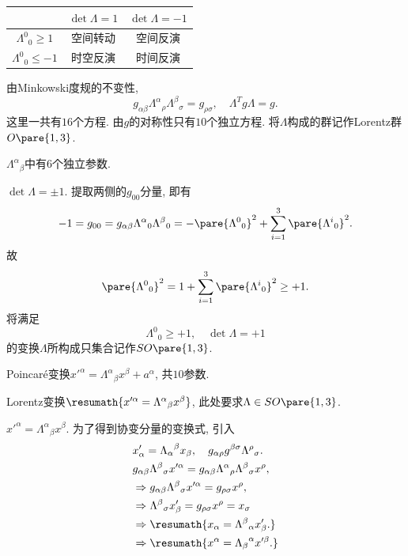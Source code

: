 \documentclass[hidelinks]{ctexart}
\begin{document}
\begin{table}[ht]
    \centering
    \begin{tabular}{c|c|c}
        & $\det \Lambda = 1$ & $\det \Lambda = -1$ \\
        \hline 
        ${\Lambda^0}_0 \ge 1$ & 空间转动 & 空间反演 \\
        \hline 
        ${\Lambda^0}_0 \le -1$ & 时空反演 & 时间反演
    \end{tabular}
\end{table}
由Minkowski度规的不变性,
\[ g_{\alpha\beta}{\Lambda^\alpha}_\rho {\Lambda^\beta}_\sigma = g_{\rho \sigma},\quad \Lambda^T g\Lambda = g. \]
这里一共有$16$个方程. 由$g$的对称性只有$10$个独立方程. 将$\Lambda$构成的群记作Lorentz群$O\pare{1,3}$.
\begin{cenum}
    \item ${\Lambda^\alpha}_\beta$中有$6$个独立参数.
    \item $\det \Lambda = \pm 1$. 提取两侧的$g_{00}$分量, 即有
    \[ -1 = g_{00} = g_{\alpha\beta}{\Lambda^\alpha}_0 {\Lambda^\beta}_0 = -\pare{{\Lambda^0}_0}^2 + \sum_{i=1}^3 \pare{{\Lambda^i}_0}^2. \]
    故
    \[ \pare{{\Lambda^0}_0}^2 = 1 + \sum_{i=1}^3 \pare{{\Lambda^i}_0}^2 \ge +1. \]
    将满足
    \[ {\Lambda^0}_0 \ge +1,\quad \det \Lambda = +1 \]
    的变换$\Lambda$所构成只集合记作$SO\pare{1,3}$.
    \item Poincar\'e变换$x'^\alpha = {\Lambda^\alpha}_\beta x^\beta + a^\alpha$, 共$10$参数.
    \item Lorentz变换$\resumath{x'^\alpha = {\Lambda^\alpha}_\beta x^\beta}$, 此处要求$\Lambda \in SO\pare{1,3}$.
\end{cenum}
\begin{ex}
    $x'^\alpha = {\Lambda^\alpha}_\beta x^\beta$. 为了得到协变分量的变换式, 引入
    \begin{align*}
        & x'_\alpha = {\Lambda_\alpha}^\beta x_\beta,\quad g_{\alpha\rho}g^{\beta\sigma}{\Lambda^\rho}_\sigma. \\
        & g_{\alpha\beta}{\Lambda^\beta}_\sigma x'^\alpha = g_{\alpha\beta}{\Lambda^\alpha}_\rho {\Lambda^\beta}_\sigma x^\rho, \\
        & \Rightarrow g_{\alpha\beta}{\Lambda^\beta}_\sigma x'^\alpha = g_{\rho\sigma}x^\rho, \\
        & \Rightarrow {\Lambda^\beta}_\sigma x'_\beta = g_{\rho\sigma}x^\rho = x_\sigma \\
        & \Rightarrow \resumath{x_\alpha = {\Lambda^\beta}_\alpha x'_\beta.} \\
        & \Rightarrow \resumath{x^\alpha = {\Lambda_\beta}^\alpha x'^\beta.}
    \end{align*}
\end{ex}
\end{document}
